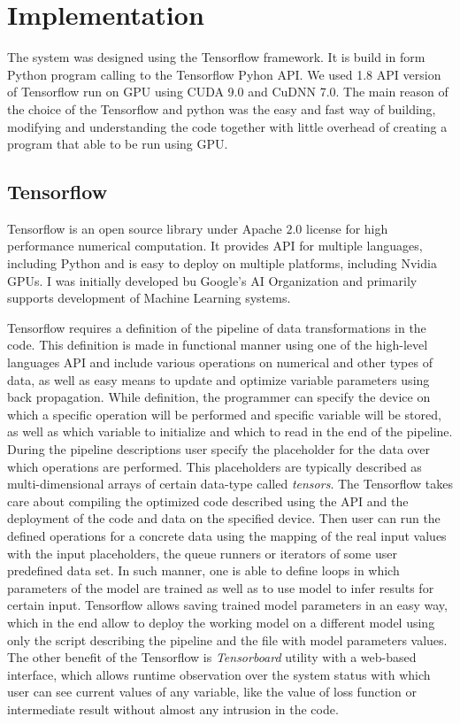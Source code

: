 
\section{Implementation}

The system was designed using the Tensorflow framework. 
It is build in form Python program calling to the Tensorflow Pyhon API.
We used 1.8 API version of Tensorflow run on GPU using CUDA 9.0 and CuDNN 7.0.
The main reason of the choice of the Tensorflow and python was the easy and fast way of building, modifying and understanding the code together with little overhead of
creating a program that able to be run using GPU. 
\medskip

\subsection{Tensorflow}

Tensorflow is an open source library under Apache $2.0$ license for high performance numerical computation\cite{tensorflow_main}.
It provides API for multiple languages, including Python and is easy to deploy on multiple platforms, including Nvidia GPUs.
I was initially developed bu Google's AI Organization and primarily supports development of Machine Learning systems.
\medskip

Tensorflow requires a definition of the pipeline of data transformations in the code.
This definition is made in functional manner using one of the high-level languages API and include various operations on numerical and other types of data, as well as easy means to update and optimize variable parameters using back propagation. 
While definition, the programmer can specify the device on which a specific operation will be performed and specific variable will be stored, as well as which variable to initialize and which to read in the end of the pipeline. 
During the pipeline descriptions user specify the placeholder for the data over which operations are performed. 
This placeholders are typically described as multi-dimensional arrays of certain data-type called \emph{tensors}.
The Tensorflow takes care about compiling the optimized code described using the API and the deployment of the code and data on the specified device. 
Then user can run the defined operations for a concrete data using the mapping of the real input values with the input placeholders, the queue runners or iterators of some user predefined data set.
In such manner, one is able to define loops in which parameters of the model are trained as well as to use model to infer results for certain input.
Tensorflow allows saving trained model parameters in an easy way, which in the end allow to deploy the working model on a different model using only the script describing the pipeline and the file with model parameters values.
The other benefit of the Tensorflow is \emph{Tensorboard} utility with a web-based interface, which allows runtime observation over the system status with which user can see current values of any variable, like the value of loss function or intermediate result without almost any intrusion in the code.
\medskip

